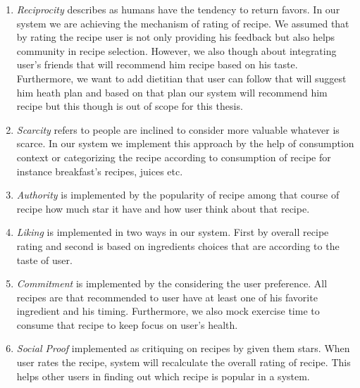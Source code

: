   \begin{enumerate}
	\item \textit{Reciprocity} describes as humans have the tendency to return favors. In our system we are achieving the mechanism of rating of recipe. We assumed that by rating the recipe user is not only providing his feedback but also helps community in recipe selection. However, we also though about integrating user’s friends that will recommend him recipe based on his taste. Furthermore, we want to add dietitian that user can follow that will suggest him heath plan and based on that plan our system will recommend him recipe but this though is out of scope for this thesis.

	\item \textit{Scarcity} refers to people are inclined to consider more valuable whatever is scarce. In our system we implement this approach by the help of consumption context or categorizing the recipe according to consumption of recipe for instance breakfast’s recipes, juices etc. 
	
	\item \textit{Authority}  is implemented by the popularity of recipe among that course of recipe how much star it have and how user think about that  recipe.
	
	\item \textit{Liking} is implemented in two ways in our system. First by overall recipe rating and second is based on ingredients choices that are according to the taste of user.

	\item \textit{Commitment} is implemented by the considering the user preference. All recipes are that recommended to user have at least one of his favorite ingredient and his timing. Furthermore, we also mock exercise time to consume that recipe to keep focus on user’s health.
	
	\item \textit{Social Proof} implemented as critiquing on recipes by given them stars. When user rates the recipe, system will recalculate the overall rating of recipe.  This helps other users in finding out which recipe is popular in a system.
\end{enumerate}


